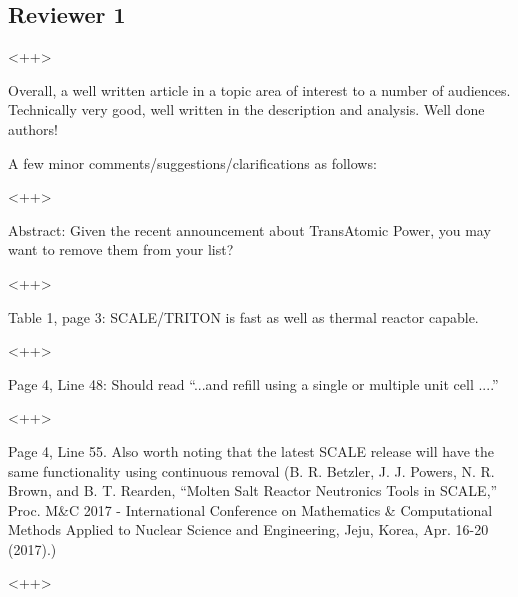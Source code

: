 \documentclass[answers,11pt]{exam}
\begin{document}
\begin{questions}
        \section*{Reviewer 1}
        \question <++> 
        \begin{solution}
                <++>
        \end{solution}


        \question Overall, a well written article in a topic area of interest 
        to a number of audiences. Technically very good, well written in the 
        description and analysis.  Well done authors! 


        A few minor comments/suggestions/clarifications as follows:
        \begin{solution}
                <++>
        \end{solution}


        \question  Abstract: Given the recent announcement about TransAtomic 
        Power, you may want to remove them from your list?
        \begin{solution}
                <++>
        \end{solution}

        \question  Table 1, page 3: SCALE/TRITON is fast as well as thermal 
        reactor capable.  
        \begin{solution}
                <++>
        \end{solution}

        \question  Page 4, Line 48: Should read ``...and refill using a single 
        or multiple unit cell ....''
        \begin{solution}
                <++>
        \end{solution}

        \question  Page 4, Line 55. Also worth noting that the latest SCALE 
        release will have the same functionality using continuous removal (B. 
        R. Betzler, J. J. Powers, N. R. Brown, and B. T. Rearden, ``Molten Salt 
        Reactor Neutronics Tools in SCALE,'' Proc. M\&C 2017 - International 
        Conference on Mathematics \& Computational Methods Applied to Nuclear 
        Science and Engineering, Jeju, Korea, Apr. 16-20 (2017).)
        \begin{solution}
                <++>
        \end{solution}


\end{questions}
\end{document}
